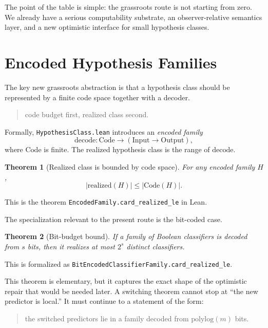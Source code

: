 \documentclass[11pt]{article}
\newtheorem{theorem}{Theorem}[section]
\theoremstyle{remark}
\begin{document}
The point of the table is simple: the grassroots route is not starting from zero.
We already have a serious computability substrate, an observer-relative semantics
layer, and a new optimistic interface for small hypothesis classes.

\section{Encoded Hypothesis Families}

The key new grassroots abstraction is that a hypothesis class should be represented
by a finite code space together with a decoder.

\begin{quote}
code budget first, realized class second.
\end{quote}

Formally, \texttt{HypothesisClass.lean} introduces an \emph{encoded family}
\[
  \mathrm{decode} : \mathrm{Code} \to (\mathrm{Input} \to \mathrm{Output}),
\]
where \(\mathrm{Code}\) is finite.  The realized hypothesis class is the range of
\(\mathrm{decode}\).

\begin{theorem}[Realized class is bounded by code space]
For any encoded family \(H\),
\[
  |\mathrm{realized}(H)| \le |\mathrm{Code}(H)|.
\]
\end{theorem}

\noindent
This is the theorem \texttt{EncodedFamily.card\_realized\_le} in Lean.

The specialization relevant to the present route is the bit-coded case.

\begin{theorem}[Bit-budget bound]
If a family of Boolean classifiers is decoded from \(s\) bits, then it realizes at
most \(2^s\) distinct classifiers.
\end{theorem}

\noindent
This is formalized as
\texttt{BitEncodedClassifierFamily.card\_realized\_le}.

This theorem is elementary, but it captures the exact shape of the optimistic
repair that would be needed later.  A switching theorem cannot stop at ``the new
predictor is local.''  It must continue to a statement of the form:

\begin{quote}
the switched predictors lie in a family decoded from \(\mathrm{polylog}(m)\) bits.
\end{quote}
\end{document}
